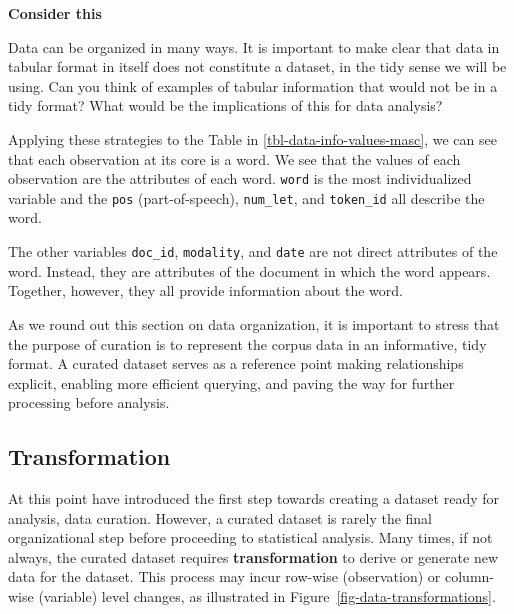 \documentclass[
  letterpaper,
  krantz1]{latex/krantz-mod}
\theoremstyle{definition}
\theoremstyle{definition}
\theoremstyle{remark}
\begin{document}
\begin{tcolorbox}[enhanced jigsaw, leftrule=.75mm, colframe=quarto-callout-color-frame, left=2mm, colback=white, toprule=.15mm, breakable, arc=.35mm, opacityback=0, bottomrule=.15mm, rightrule=.15mm]

\textbf{ Consider this}

Data can be organized in many ways. It is important to make clear that
data in tabular format in itself does not constitute a dataset, in the
tidy sense we will be using. Can you think of examples of tabular
information that would not be in a tidy format? What would be the
implications of this for data analysis?

\end{tcolorbox}

Applying these strategies to the Table in
\ref{tbl-data-info-values-masc}, we can see that each observation at its
core is a word. We see that the values of each observation are the
attributes of each word. \texttt{word} is the most individualized
variable and the \texttt{pos} (part-of-speech), \texttt{num\_let}, and
\texttt{token\_id} all describe the word.

The other variables \texttt{doc\_id}, \texttt{modality}, and
\texttt{date} are not direct attributes of the word. Instead, they are
attributes of the document in which the word appears. Together, however,
they all provide information about the word.

As we round out this section on data organization, it is important to
stress that the purpose of curation is to represent the corpus data in
an informative, tidy format. A curated dataset serves as a reference
point making relationships explicit, enabling more efficient querying,
and paving the way for further processing before analysis.

\subsection{Transformation}\label{sec-data-transformation}

At this point have introduced the first step towards creating a dataset
ready for analysis, data curation. However, a curated dataset is rarely
the final organizational step before proceeding to statistical analysis.
Many times, if not always, the curated dataset requires
\textbf{transformation} to derive or generate new data for the dataset.
This process may incur row-wise (observation) or column-wise (variable)
level changes, as illustrated in Figure~\ref{fig-data-transformations}.
\end{document}
